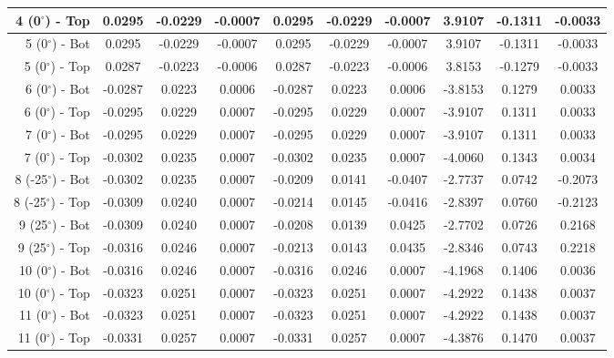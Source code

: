 \begin{table}[H]
\begin{longtable}{rccccccccc}
4 (0$^\circ$) - Top   &        0.0295 &       -0.0229 &       -0.0007 &        0.0295 &       -0.0229 &       -0.0007 &      3.9107 &     -0.1311 &     -0.0033 \\ \midrule
5 (0$^\circ$) - Bot   &        0.0295 &       -0.0229 &       -0.0007 &        0.0295 &       -0.0229 &       -0.0007 &      3.9107 &     -0.1311 &     -0.0033 \\
5 (0$^\circ$) - Top   &        0.0287 &       -0.0223 &       -0.0006 &        0.0287 &       -0.0223 &       -0.0006 &      3.8153 &     -0.1279 &     -0.0033 \\ \midrule
6 (0$^\circ$) - Bot   &       -0.0287 &        0.0223 &        0.0006 &       -0.0287 &        0.0223 &        0.0006 &     -3.8153 &      0.1279 &      0.0033 \\
6 (0$^\circ$) - Top   &       -0.0295 &        0.0229 &        0.0007 &       -0.0295 &        0.0229 &        0.0007 &     -3.9107 &      0.1311 &      0.0033 \\ \midrule
7 (0$^\circ$) - Bot   &       -0.0295 &        0.0229 &        0.0007 &       -0.0295 &        0.0229 &        0.0007 &     -3.9107 &      0.1311 &      0.0033 \\
7 (0$^\circ$) - Top   &       -0.0302 &        0.0235 &        0.0007 &       -0.0302 &        0.0235 &        0.0007 &     -4.0060 &      0.1343 &      0.0034 \\ \midrule
8 (-25$^\circ$) - Bot &       -0.0302 &        0.0235 &        0.0007 &       -0.0209 &        0.0141 &       -0.0407 &     -2.7737 &      0.0742 &     -0.2073 \\
8 (-25$^\circ$) - Top &       -0.0309 &        0.0240 &        0.0007 &       -0.0214 &        0.0145 &       -0.0416 &     -2.8397 &      0.0760 &     -0.2123 \\ \midrule
9 (25$^\circ$) - Bot  &       -0.0309 &        0.0240 &        0.0007 &       -0.0208 &        0.0139 &        0.0425 &     -2.7702 &      0.0726 &      0.2168 \\
9 (25$^\circ$) - Top  &       -0.0316 &        0.0246 &        0.0007 &       -0.0213 &        0.0143 &        0.0435 &     -2.8346 &      0.0743 &      0.2218 \\ \midrule
10 (0$^\circ$) - Bot  &       -0.0316 &        0.0246 &        0.0007 &       -0.0316 &        0.0246 &        0.0007 &     -4.1968 &      0.1406 &      0.0036 \\
10 (0$^\circ$) - Top  &       -0.0323 &        0.0251 &        0.0007 &       -0.0323 &        0.0251 &        0.0007 &     -4.2922 &      0.1438 &      0.0037 \\ \midrule
11 (0$^\circ$) - Bot  &       -0.0323 &        0.0251 &        0.0007 &       -0.0323 &        0.0251 &        0.0007 &     -4.2922 &      0.1438 &      0.0037 \\
11 (0$^\circ$) - Top  &       -0.0331 &        0.0257 &        0.0007 &       -0.0331 &        0.0257 &        0.0007 &     -4.3876 &      0.1470 &      0.0037 \\
\end{longtable}
\end{table}